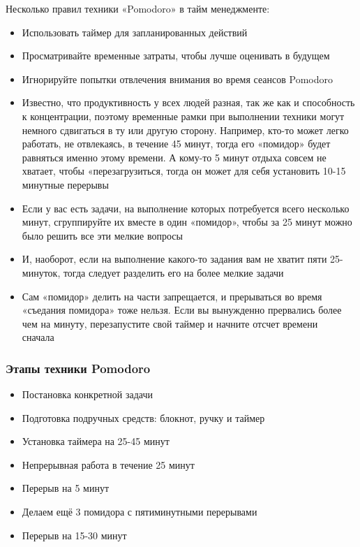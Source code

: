\documentclass{../industrial-development}
\begin{document}
Несколько правил техники «Pomodoro» в тайм менеджменте:
\begin{itemize}
\item Использовать таймер для запланированных действий
\item Просматривайте временные затраты, чтобы лучше оценивать в будущем
\item Игнорируйте попытки отвлечения внимания во время сеансов Pomodoro~\cite{TMSeimer}
\item Известно, что продуктивность у всех людей разная, так же как и способность к концентрации, поэтому временные рамки при выполнении техники могут немного сдвигаться в ту или другую сторону. Например, кто-то может легко работать, не отвлекаясь, в течение 45 минут, тогда его «помидор» будет равняться именно этому времени. А кому-то 5 минут отдыха совсем не хватает, чтобы «перезагрузиться, тогда он может для себя установить 10-15 минутные перерывы
\item Если у вас есть задачи, на выполнение которых потребуется всего несколько минут, сгруппируйте их вместе в один «помидор», чтобы за 25 минут можно было решить все эти мелкие вопросы
\item И, наоборот, если на выполнение какого-то задания вам не хватит пяти 25-минуток, тогда следует разделить его на более мелкие задачи
\item Сам «помидор» делить на части запрещается, и прерываться во время «съедания помидора» тоже нельзя. Если вы вынужденно прервались более чем на минуту, перезапустите свой таймер и начните отсчет времени сначала~\cite{Pomidoro}
\end{itemize}

\begin{frame} \frametitle{Этапы техники Pomodoro}
  \begin{itemize}
  \item Постановка конкретной задачи
  \item Подготовка подручных средств: блокнот, ручку и таймер
  \item Установка таймера на 25-45 минут
  \item Непрерывная работа в течение 25 минут
  \item Перерыв на 5 минут
  \item Делаем ещё 3 помидора с пятиминутными перерывами
  \item Перерыв на 15-30 минут
  \end{itemize}
\end{frame}

\lecturenotes
\end{document}
